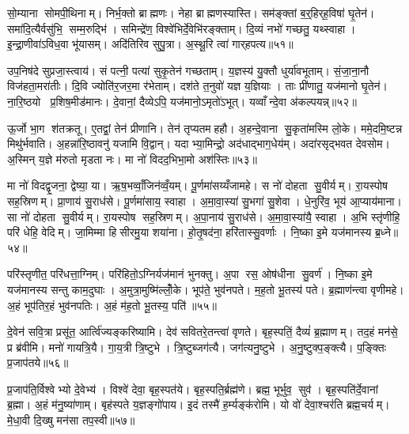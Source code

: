 सो॒म्याना सोमपी॒थिनाम्। निर्भ॒क्तो ब्राह्मणः। नेहा ब्राह्मणस्यास्ति। सम॑ङ्क्तां ब॒र्॒हिर्‌ह॒विषा॑ घृ॒तेन॑। समा॑दि॒त्यैर्वसु॑भि॒ सम्म॒रुद्भि॑। समिन्द्रे॑ण॒ विश्वे॑भिर्दे॒वेभि॑रङ्क्ताम्। दि॒व्यं नभो॑ गच्छतु॒ यथ्स्वाहा। इ॒न्द्रा॒णीवा॑ऽविध॒वा भू॑यासम्। अदि॑तिरिव सुपु॒त्रा। अ॒स्थू॒रि त्वा॑ गार्‌हपत्य॥५१॥

उप॒निष॑दे सुप्रजा॒स्त्वाय॑। सं पत्नी॒ पत्या॑ सुकृ॒तेन॑ गच्छताम्। य॒ज्ञस्य॑ यु॒क्तौ धुर्या॑वभूताम्। सं॒जा॒ना॒नौ विज॑हता॒मरा॑तीः। दि॒वि ज्योति॑र॒जर॒मा र॑भेताम्। दश॑ते त॒नुवो॑ यज्ञ य॒ज्ञियाः। ताः प्री॑णातु॒ यज॑मानो घृ॒तेन॑। ना॒रि॒ष्ठयो प्र॒शिष॒मीड॑मानः। दे॒वानां॒ दैव्येऽपि॒ यज॑मानो॒ऽमृतो॑ऽभूत्। यव्वाँन्दे॒वा अ॑कल्पयन्न्॥५२॥

ऊ॒र्जो भा॒ग श॑तक्रतू। ए॒तद्वां॒ तेन॑ प्रीणानि। तेन॑ तृप्यतमहहौ। अ॒हन्दे॒वाना सु॒कृता॑मस्मि लो॒के। ममे॒दमि॒ष्टन्न मिथु॑र्भवाति। अ॒हन्ना॑रि॒ष्ठावनु॑ यजामि वि॒द्वान्। यदाभ्या॒मिन्द्रो॒ अद॑धाद्भाग॒धेय॑म्। अदा॑रसृद्भवत देवसोम। अ॒स्मिन् य॒ज्ञे म॑रुतो मृडता नः। मा नो॑ विदद॒भिभा॒मो अश॑स्तिः॥५३॥

मा नो॑ विदद्वृ॒जना॒ द्वेष्या॒ या। ऋ॒ष॒भव्वाँ॒जिन॑व्वँ॒यम्। पू॒र्णमा॑सय्यँजामहे। स नो॑ दोहता सु॒वीर्यम्। रा॒यस्पोष सह॒स्रिणम्। प्रा॒णाय॑ सु॒राध॑से। पू॒र्णमा॑साय॒ स्वाहा। अ॒मा॒वा॒स्या॑ सु॒भगा॑ सु॒शेवा। धे॒नुरि॑व॒ भूय॑ आ॒प्याय॑माना। सा नो॑ दोहता सु॒वीर्यम्। रा॒यस्पोष सह॒स्रिणम्। अ॒पा॒नाय॑ सु॒राध॑से। अ॒मा॒वा॒स्या॑यै॒ स्वाहा। अ॒भि स्तृ॑णीहि॒ परि॑ धेहि॒ वेदिम्। जा॒मिम्मा हिसीरमु॒या शया॑ना। हो॒तृ॒षद॑ना॒ हरि॑तास्सु॒वर्णाः। नि॒ष्का इ॒मे यज॑मानस्य ब्र॒ध्ने॥५४॥

परि॑स्तृणीत॒ परि॑धत्ता॒ग्निम्। परि॑हितो॒ऽग्निर्यज॑मानं भुनक्तु। अ॒पा रस॒ ओष॑धीना सु॒वर्ण॑। नि॒ष्का इ॒मे यज॑मानस्य सन्तु काम॒दुघाः। अ॒मुत्रा॒मुष्मि॑ल्लोँ॒के। भूप॑ते॒ भुव॑नपते। म॒ह॒तो भू॒तस्य॑ पते। ब्र॒ह्माण॑न्त्वा वृणीमहे। अ॒हं भूप॑तिर॒हं भुव॑नपतिः। अ॒हं म॑ह॒तो भू॒तस्य॒ पति॑॥५५॥

दे॒वेन॑ सवि॒त्रा प्रसू॑त॒ आर्त्वि॑ज्यङ्करिष्यामि। देव॑ सवितरे॒तन्त्वा॑ वृणते। बृह॒स्पतिं॒ दैव्यं॑ ब्र॒ह्माणम्। तद॒हं मन॑से॒ प्र ब्र॑वीमि। मनो॑ गायत्रि॒यै। गा॒य॒त्री त्रि॒ष्टुभे। त्रि॒ष्टुब्जग॑त्यै। जग॑त्यनु॒ष्टुभे। अ॒नु॒ष्टुक्प॒ङ्क्त्यै। प॒ङ्क्तिः प्र॒जाप॑तये॥५६॥

प्र॒जाप॑ति॒र्विश्वेभ्यो दे॒वेभ्य॑। विश्वे॑ देवा॒ बृह॒स्पत॑ये। बृह॒स्पति॒र्ब्रह्म॑णे। ब्रह्म॒ भूर्भुव॒ सुव॑। बृह॒स्पति॑र्दे॒वानां ब्र॒ह्मा। अ॒हं म॑नु॒ष्या॑णाम्। बृह॑स्पते य॒ज्ञङ्गो॑पाय। इ॒दं तस्मै॑ ह॒र्म्यङ्क॑रोमि। यो वो॑ देवा॒श्चर॑ति ब्रह्म॒चर्यम्। मे॒धा॒वी दि॒ख्षु मन॑सा तप॒स्वी॥५७॥

